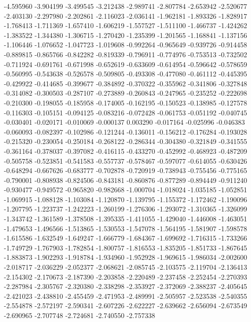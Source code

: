 -4.595960
-3.904199
-3.499545
-3.212438
-2.989741
-2.807784
-2.653942
-2.520677
-2.403130
-2.297980
-2.202861
-2.116023
-2.036141
-1.962181
-1.893326
-1.828917
-1.768413
-1.711369
-1.657410
-1.606219
-1.557527
-1.511100
-1.466737
-1.424262
-1.383522
-1.344380
-1.306715
-1.270420
-1.235399
-1.201565
-1.168841
-1.137156
-1.106446
-1.076652
-1.047723
-1.019608
-0.992264
-0.965649
-0.939726
-0.914458
-0.889815
-0.865766
-0.842282
-0.819339
-0.796911
-0.774976
-0.753513
-0.732502
-0.711924
-0.691761
-0.671998
-0.652619
-0.633609
-0.614954
-0.596642
-0.578659
-0.560995
-0.543638
-0.526578
-0.509805
-0.493308
-0.477080
-0.461112
-0.445395
-0.429922
-0.414685
-0.399677
-0.384892
-0.370322
-0.355962
-0.341806
-0.327848
-0.314082
-0.300503
-0.287107
-0.273889
-0.260843
-0.247965
-0.235252
-0.222698
-0.210300
-0.198055
-0.185958
-0.174005
-0.162195
-0.150523
-0.138985
-0.127578
-0.116303
-0.105151
-0.094125
-0.083216
-0.072428
-0.061753
-0.051192
-0.040745
-0.030401
-0.020171
-0.010069
-0.000137
0.003290
-0.017164
-0.025996
-0.046383
-0.060093
-0.082397
-0.102986
-0.121244
-0.136011
-0.156212
-0.176284
-0.193028
-0.215320
-0.230054
-0.250184
-0.268122
-0.286344
-0.304380
-0.321849
-0.341555
-0.361164
-0.378037
-0.397082
-0.416115
-0.433270
-0.452992
-0.468923
-0.487209
-0.505758
-0.523851
-0.541583
-0.557737
-0.578467
-0.597077
-0.614055
-0.630426
-0.648294
-0.667626
-0.683777
-0.702878
-0.720919
-0.738943
-0.755456
-0.775165
-0.790001
-0.808938
-0.824506
-0.843181
-0.860876
-0.877289
-0.894449
-0.911240
-0.930477
-0.949572
-0.965820
-0.982668
-1.000704
-1.018024
-1.035185
-1.052851
-1.069915
-1.088128
-1.103084
-1.120870
-1.139795
-1.155372
-1.172462
-1.190096
-1.207795
-1.223737
-1.242223
-1.260199
-1.276306
-1.293072
-1.310365
-1.326099
-1.343742
-1.361589
-1.378508
-1.395335
-1.411055
-1.429040
-1.446008
-1.463051
-1.479653
-1.496566
-1.513865
-1.530553
-1.547078
-1.564195
-1.581907
-1.598578
-1.615586
-1.632549
-1.649247
-1.666779
-1.684367
-1.699692
-1.716315
-1.733266
-1.749729
-1.767903
-1.782854
-1.800757
-1.816553
-1.835205
-1.851733
-1.867645
-1.883873
-1.902293
-1.918784
-1.934960
-1.952928
-1.969615
-1.986034
-2.002600
-2.018717
-2.036229
-2.052377
-2.068621
-2.085745
-2.103575
-2.119704
-2.136413
-2.154302
-2.170673
-2.187390
-2.203858
-2.220489
-2.237458
-2.252454
-2.270393
-2.287984
-2.305767
-2.320380
-2.338298
-2.353927
-2.372069
-2.388237
-2.405645
-2.421023
-2.438810
-2.455459
-2.471953
-2.489991
-2.505957
-2.523538
-2.540355
-2.554878
-2.572197
-2.590341
-2.607226
-2.622227
-2.639662
-2.656094
-2.673549
-2.690965
-2.707748
-2.724681
-2.740550
-2.757338
